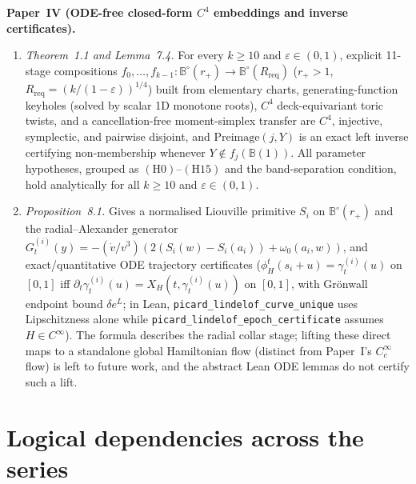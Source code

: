 \documentclass[11pt]{amsart}
\newcommand{\eps}{\varepsilon}
\newcommand{\EB}{\mathbb{B}}
\begin{document}
\smallskip\noindent\textbf{Paper~IV (ODE-free closed-form $C^4$ embeddings and inverse certificates).}
\begin{enumerate}[label=(\roman*),leftmargin=2em]
\item \emph{Theorem~1.1 and Lemma~7.4.} For every $k\ge10$ and $\eps\in(0,1)$, explicit 11-stage compositions $f_0,\dots,
f_{k-1}\colon\EB^{\circ}(r_+)\to\EB^{\circ}(R_{\mathrm{req}})$ ($r_+>1$, $R_{\mathrm{req}}=(k/(1-\eps))^{1/4}$) built
from elementary charts, generating-function keyholes (solved by scalar 1D monotone roots), $C^4$ deck-equivariant toric
twists, and a cancellation-free moment-simplex transfer are $C^4$, injective, symplectic, and pairwise disjoint, and
$\mathrm{Preimage}(j,Y)$ is an exact left inverse certifying non-membership whenever $Y\notin f_j(\EB(1))$. All
parameter hypotheses, grouped as $\mathrm{(H0)}$--$\mathrm{(H15)}$ and the band-separation condition, hold analytically
for all $k\ge10$ and $\eps\in(0,1)$.
\item \emph{Proposition~8.1.} Gives a normalised Liouville primitive $S_i$ on $\EB^{\circ}(r_+)$ and the
radial--Alexander generator $G_t^{(i)}(y)=-(\dot v/v^3)(2(S_i(w)-S_i(a_i))+\omega_0(a_i,w))$, and exact/quantitative
ODE trajectory certificates ($\phi_H^t(s_i+u)=\gamma_t^{(i)}(u)$ on $[0,1]$ iff $\partial_t\gamma_t^{(i)}(u)=
X_H(t,\gamma_t^{(i)}(u))$ on $[0,1]$, with Gr\"onwall endpoint bound $\delta e^L$; in Lean,
\texttt{picard\_\allowbreak lindelof\_\allowbreak curve\_\allowbreak unique} uses Lipschitzness alone while
\texttt{picard\_\allowbreak lindelof\_\allowbreak epoch\_\allowbreak certificate} assumes $H\in C^\infty$).
The formula describes the radial collar stage; lifting these direct maps to a standalone global Hamiltonian flow
(distinct from Paper~I's $C^\infty_c$ flow) is left to future work, and the abstract Lean ODE lemmas do not certify
such a lift.
\end{enumerate}

\section{Logical dependencies across the series}\label{sec:dependencies}
\end{document}
